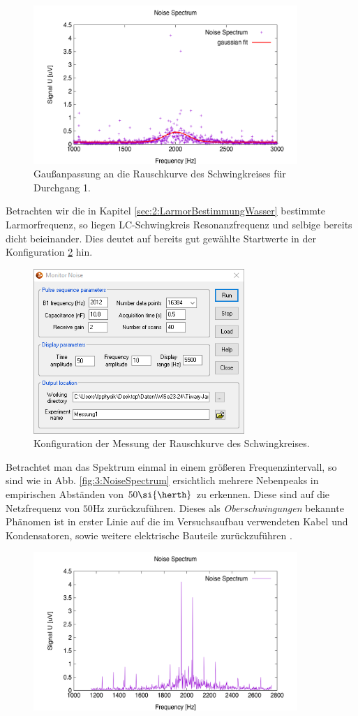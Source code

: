 \documentclass{article}
\begin{document}
    \begin{figure}[H]
        \centering
        \includegraphics[width=10cm]{../Bilddateien/Messung1_Noise_Spectrum_Gaussian.png}
        \caption{Gaußanpassung an die Rauschkurve des Schwingkreises für Durchgang 1.}
        \label{fig:3:GaussFit1}
    \end{figure}
    Betrachten wir die in Kapitel \ref{sec:2:LarmorBestimmungWasser} bestimmte Larmorfrequenz, so liegen LC-Schwingkreis Resonanzfrequenz und selbige bereits dicht beieinander. Dies deutet auf bereits gut gewählte Startwerte in der Konfiguration \ref{fig:3:MonitorNoiseConfig} hin. 
    \begin{figure}[H]
        \centering
        \includegraphics[width=8cm]{../Bilddateien/Sec3_Monitor_Noise_Configuration.png}
        \caption{Konfiguration der Messung der Rauschkurve des Schwingkreises.}
        \label{fig:3:MonitorNoiseConfig}
    \end{figure}
    Betrachtet man das Spektrum einmal in einem größeren Frequenzintervall, so sind wie in Abb. \ref{fig:3:NoiseSpectrum} ersichtlich mehrere Nebenpeaks in empirischen Abständen von $50\si{\herth}$ zu erkennen. Diese sind auf die Netzfrequenz von $50\si{\hertz}$ zurückzuführen. Dieses als \emph{Oberschwingungen} bekannte Phänomen ist in erster Linie auf die im Versuchsaufbau verwendeten Kabel und Kondensatoren, sowie weitere elektrische Bauteile zurückzuführen \cite[TÜV]{TUEV:Oberschwingungen}.
    \begin{figure}[H]
        \centering
        \includegraphics[width=10cm]{../Bilddateien/Messung1_Noise_Spectrum.png}
    \end{figure}

    
\end{document}
